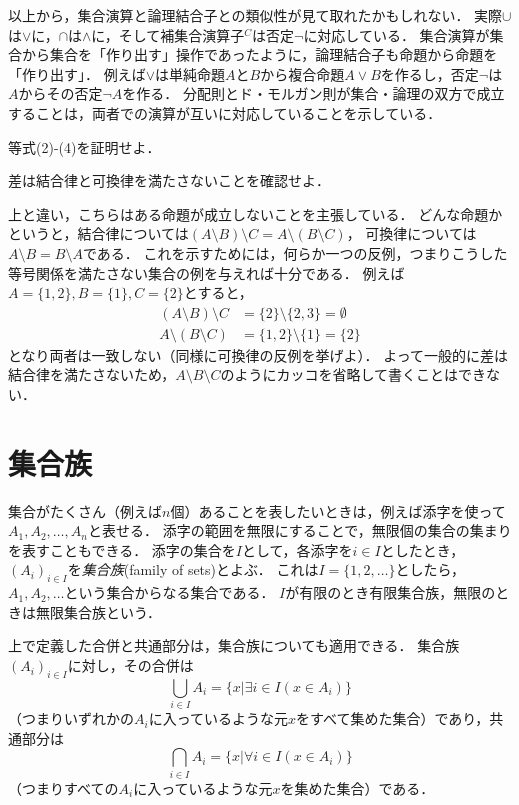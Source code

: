\documentclass[11pt,a4paper]{jsarticle}
\begin{document}
以上から，集合演算と論理結合子との類似性が見て取れたかもしれない．
実際$\cup$は$\vee$に，$\cap$は$\wedge$に，そして補集合演算子$^C$は否定$\neg$に対応している．
集合演算が集合から集合を「作り出す」操作であったように，論理結合子も命題から命題を「作り出す」．
例えば$\vee$は単純命題$A$と$B$から複合命題$A\vee B$を作るし，否定$\neg$は$A$からその否定$\neg A$を作る．
分配則とド・モルガン則が集合・論理の双方で成立することは，両者での演算が互いに対応していることを示している．

\begin{exercise}
等式(2)-(4)を証明せよ．
\end{exercise}

\begin{exercise}
差は結合律と可換律を満たさないことを確認せよ．
\end{exercise}

上と違い，こちらはある命題が成立しないことを主張している．
どんな命題かというと，結合律については$(A \setminus B) \setminus C = A \setminus (B \setminus C)$，
可換律については$A \setminus B = B \setminus A$である．
これを示すためには，何らか一つの反例，つまりこうした等号関係を満たさない集合の例を与えれば十分である．
例えば$A = \{1, 2 \}, B = \{1 \}, C = \{2 \}$とすると，
\begin{align*}
(A \setminus B) \setminus C &= \{ 2 \} \setminus \{2, 3\} = \emptyset \\
A \setminus (B \setminus C) &= \{ 1, 2 \} \setminus \{1 \} = \{ 2 \}
\end{align*}
となり両者は一致しない（同様に可換律の反例を挙げよ）．
よって一般的に差は結合律を満たさないため，$A \setminus B \setminus C$のようにカッコを省略して書くことはできない．




\section{集合族}
集合がたくさん（例えば$n$個）あることを表したいときは，例えば添字を使って$A_1, A_2, \dots, A_n$と表せる．
添字の範囲を無限にすることで，無限個の集合の集まりを表すこともできる．
添字の集合を$I$として，各添字を$i \in I$としたとき，$(A_i)_{i\in I}$を\emph{集合族}(family of sets)とよぶ．
これは$I = \{1, 2,  \dots\}$としたら，$A_1, A_2, \dots$という集合からなる集合である．
$I$が有限のとき有限集合族，無限のときは無限集合族という．

上で定義した合併と共通部分は，集合族についても適用できる．
集合族$(A_i)_{i\in I}$に対し，その合併は
\[
 \bigcup_{i \in I} A_i = \{ x | \exists i \in I (x \in A_i) \}
\]
（つまりいずれかの$A_i$に入っているような元$x$をすべて集めた集合）であり，共通部分は
\[
 \bigcap_{i \in I} A_i = \{ x | \forall i \in I (x \in A_i) \}
\]
（つまりすべての$A_i$に入っているような元$x$を集めた集合）である．
\end{document}
